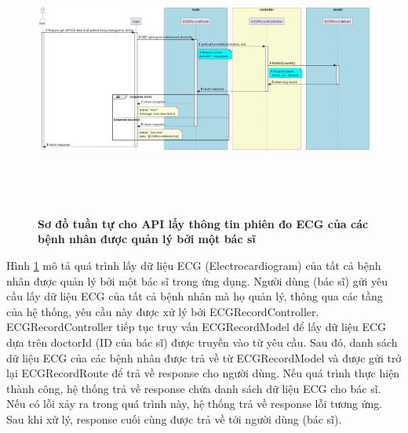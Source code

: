 \begin{figure}[H]
  \centering
  \includegraphics[width=16cm,height=9cm]{Images/server/sequence/server/getEcgRecordsByDoctor.png}
  \caption[Sơ đồ tuần tự cho API lấy thông tin phiên đo ECG của các bệnh nhân được quản lý bởi một bác sĩ ]{\bfseries \fontsize{12pt}{0pt}
  \selectfont Sơ đồ tuần tự cho API lấy thông tin phiên đo ECG của các bệnh nhân được quản lý bởi một bác sĩ }
  \label{getEcgRecordsByDoctor} %
\end{figure}
Hình \ref{getEcgRecordsByDoctor} mô tả quá trình lấy dữ liệu ECG (Electrocardiogram) của tất cả bệnh nhân được quản lý bởi một bác sĩ trong ứng dụng. Người dùng (bác sĩ) gửi yêu cầu lấy dữ liệu ECG của tất cả bệnh nhân mà họ quản lý, thông qua các tầng của hệ thống, yêu cầu này được xử lý bởi ECGRecordController. ECGRecordController tiếp tục truy vấn ECGRecordModel để lấy dữ liệu ECG dựa trên doctorId (ID của bác sĩ) được truyền vào từ yêu cầu. Sau đó, danh sách dữ liệu ECG của các bệnh nhân được trả về từ ECGRecordModel và được gửi trở lại ECGRecordRoute để trả về response cho người dùng. Nếu quá trình thực hiện thành công, hệ thống trả về response chứa danh sách dữ liệu ECG cho bác sĩ. Nếu có lỗi xảy ra trong quá trình này, hệ thống trả về response lỗi tương ứng. Sau khi xử lý, response cuối cùng được trả về tới người dùng (bác sĩ).


